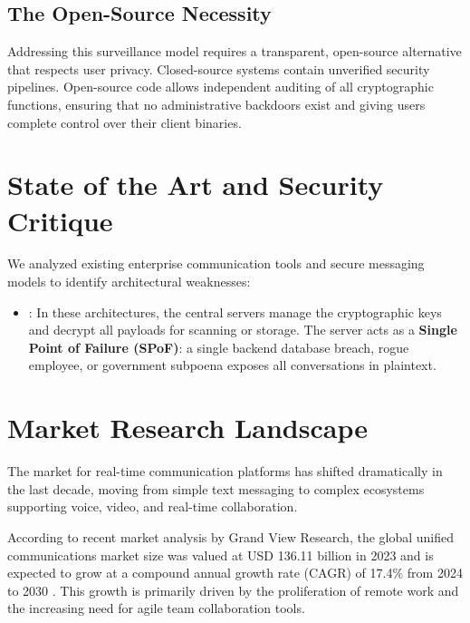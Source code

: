 \subsection{The Open-Source Necessity}
Addressing this surveillance model requires a transparent, open-source alternative that respects user privacy. Closed-source systems contain unverified security pipelines. Open-source code allows independent auditing of all cryptographic functions, ensuring that no administrative backdoors exist and giving users complete control over their client binaries.

\section{State of the Art and Security Critique}
We analyzed existing enterprise communication tools and secure messaging models to identify architectural weaknesses:

\begin{itemize}
    \item {}: In these architectures, the central servers manage the cryptographic keys and decrypt all payloads for scanning or storage. The server acts as a \textbf{Single Point of Failure (SPoF)}: a single backend database breach, rogue employee, or government subpoena exposes all conversations in plaintext.
\end{itemize}
\section{Market Research Landscape}
The market for real-time communication platforms has shifted dramatically in the last decade, moving from simple text messaging to complex ecosystems supporting voice, video, and real-time collaboration.

According to recent market analysis by Grand View Research, the global unified communications market size was valued at USD 136.11 billion in 2023 and is expected to grow at a compound annual growth rate (CAGR) of 17.4\% from 2024 to 2030 \cite{grandviewucaas}. This growth is primarily driven by the proliferation of remote work and the increasing need for agile team collaboration tools.

